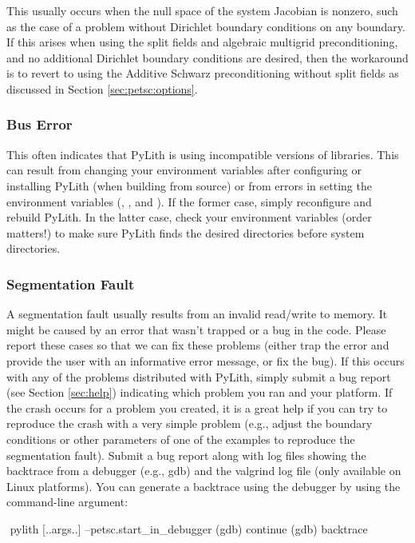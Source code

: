 This usually occurs when the null space of the system Jacobian is
nonzero, such as the case of a problem without Dirichlet boundary
conditions on any boundary. If this arises when using the split fields
and algebraic multigrid preconditioning, and no additional Dirichlet
boundary conditions are desired, then the workaround is to revert
to using the Additive Schwarz preconditioning without split fields
as discussed in Section \vref{sec:petsc:options}.

\subsubsection{Bus Error}

This often indicates that PyLith is using incompatible versions of
libraries. This can result from changing your environment variables
after configuring or installing PyLith (when building from source) or
from errors in setting the environment variables (,
, and ). If the
former case, simply reconfigure and rebuild PyLith. In the latter
case, check your environment variables (order matters!) to make sure
PyLith finds the desired directories before system directories.

\subsubsection{Segmentation Fault}

A segmentation fault usually results from an invalid read/write to
memory. It might be caused by an error that wasn't trapped or a bug in
the code. Please report these cases so that we can fix these problems
(either trap the error and provide the user with an informative error
message, or fix the bug). If this occurs with any of the problems
distributed with PyLith, simply submit a bug report (see Section
\vref{sec:help}) indicating which problem you ran and your
platform. If the crash occurs for a problem you created, it is a great
help if you can try to reproduce the crash with a very simple problem
(e.g., adjust the boundary conditions or other parameters of one of
the examples to reproduce the segmentation fault). Submit a bug report
along with log files showing the backtrace from a debugger (e.g., gdb)
and the valgrind log file (only available on Linux platforms).  You
can generate a backtrace using the debugger by using the
 command-line argument:
\begin{shell}
$$ pylith [..args..] --petsc.start_in_debugger
(gdb) continue
(gdb) backtrace
\end{shell}

